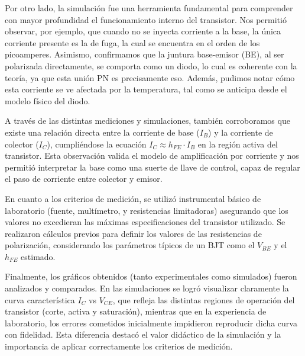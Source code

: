 \documentclass[chaptersright]{informeutn}
\begin{document}
  Por otro lado, la simulación fue una herramienta fundamental para comprender con mayor profundidad el funcionamiento 
  interno del transistor. Nos permitió observar, por ejemplo, que cuando no se inyecta corriente a la base, la única 
  corriente presente es la de fuga, la cual se encuentra en el orden de los picoamperes. Asimismo, confirmamos que la 
  juntura base-emisor (BE), al ser polarizada directamente, se comporta como un diodo, lo cual es coherente con la 
  teoría, ya que esta unión PN es precisamente eso. Además, pudimos notar cómo esta corriente se ve afectada por la 
  temperatura, tal como se anticipa desde el modelo físico del diodo.
  
  A través de las distintas mediciones y simulaciones, también corroboramos que existe una relación directa entre la 
  corriente de base ($I_B$) y la corriente de colector ($I_C$), cumpliéndose la ecuación $I_C \approx h_{FE} \cdot I_B$ 
  en la región activa del transistor. Esta observación valida el modelo de amplificación por corriente y nos permitió 
  interpretar la base como una suerte de llave de control, capaz de regular el paso de corriente entre colector y
  emisor.
  
  En cuanto a los criterios de medición, se utilizó instrumental básico de laboratorio (fuente, multímetro, y 
  resistencias limitadoras) asegurando que los valores no excedieran las máximas especificaciones del transistor 
  utilizado. Se realizaron cálculos previos para definir los valores de las resistencias de polarización, considerando 
  los parámetros típicos de un BJT como el $V_{BE}$ y el $h_{FE}$ estimado.
  
  Finalmente, los gráficos obtenidos (tanto experimentales como simulados) fueron analizados y comparados. En las 
  simulaciones se logró visualizar claramente la curva característica $I_C$ vs $V_{CE}$, que refleja las distintas 
  regiones de operación del transistor (corte, activa y saturación), mientras que en la experiencia de laboratorio, los 
  errores cometidos inicialmente impidieron reproducir dicha curva con fidelidad. Esta diferencia destacó el valor 
  didáctico de la simulación y la importancia de aplicar correctamente los criterios de medición. 
\end{document}
